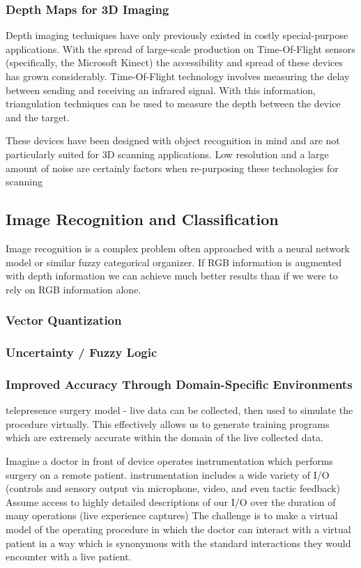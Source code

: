 \documentclass[a4paper,12pt]{report}
\begin{document}
\subsubsection{Depth Maps for 3D Imaging}
Depth imaging techniques have only previously existed in costly special-purpose applications. With the spread of large-scale production on Time-Of-Flight sensors (specifically, the Microsoft Kinect) the accessibility and spread of these devices has grown considerably. Time-Of-Flight technology involves measuring the delay between sending and receiving an infrared signal. With this information, triangulation techniques can be used to measure the depth between the device and the target. 

These devices have been designed with object recognition in mind and are not particularly suited for 3D scanning applications. Low resolution and a large amount of noise are certainly factors when re-purposing these technologies for scanning\cite{6296662} 
\subsection{Image Recognition and Classification}
Image recognition is a complex problem often approached with a neural network model or similar fuzzy categorical organizer. If RGB information is augmented with depth information we can achieve much better results than if we were to rely on RGB information alone.
\subsubsection{Vector Quantization}
\subsubsection{Uncertainty / Fuzzy Logic}
\subsubsection{Improved Accuracy Through Domain-Specific Environments}
telepresence surgery model - live data can be collected, then used to simulate the procedure virtually. 
This effectively allows us to generate training programs which are extremely accurate within the domain of the live collected data.

Imagine a doctor in front of device operates instrumentation which performs surgery on a remote patient.
instrumentation includes a wide variety of I/O (controls and sensory output via microphone, video, and even tactic feedback)
Assume access to highly detailed descriptions of our I/O over the duration of many operations (live experience captures)
The challenge is to make a virtual model of the operating procedure in which the doctor can interact with a virtual patient in a way which is synonymous with the standard interactions they would encounter with a live patient.
\end{document}
